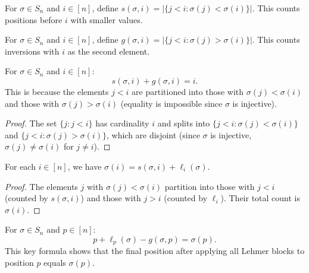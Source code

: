\begin{definition}
\label{def.perm.smallerBefore}
\leanhelper
\leanok
For $\sigma \in S_n$ and $i \in [n]$, define
$s(\sigma, i) = |\{j < i : \sigma(j) < \sigma(i)\}|$.
This counts positions before $i$ with smaller values.
\end{definition}

\begin{definition}
\label{def.perm.largerBefore}
\leanhelper
\leanok
For $\sigma \in S_n$ and $i \in [n]$, define
$g(\sigma, i) = |\{j < i : \sigma(j) > \sigma(i)\}|$.
This counts inversions with $i$ as the second element.
\end{definition}

\begin{lemma}
\label{lem.perm.smallerBefore_add_largerBefore}
\leanhelper
\leanok
For $\sigma \in S_n$ and $i \in [n]$:
\[
s(\sigma, i) + g(\sigma, i) = i.
\]
This is because the elements $j < i$ are partitioned into those with $\sigma(j) < \sigma(i)$
and those with $\sigma(j) > \sigma(i)$ (equality is impossible since $\sigma$ is injective).
\end{lemma}

\begin{proof}
The set $\{j : j < i\}$ has cardinality $i$ and splits into
$\{j < i : \sigma(j) < \sigma(i)\}$ and $\{j < i : \sigma(j) > \sigma(i)\}$,
which are disjoint (since $\sigma$ is injective, $\sigma(j) \neq \sigma(i)$ for $j \neq i$).
\end{proof}

\begin{lemma}
\label{lem.perm.sigma-eq-formula}
\leanhelper
\leanok
For each $i \in [n]$, we have
$\sigma(i) = s(\sigma, i) + \ell_i(\sigma)$.
\end{lemma}

\begin{proof}
\leanok
The elements $j$ with $\sigma(j) < \sigma(i)$ partition into those with $j < i$
(counted by $s(\sigma, i)$) and those with $j > i$
(counted by $\ell_i$). Their total count is $\sigma(i)$.
\end{proof}

\begin{lemma}
\label{lem.perm.final_position_formula}
\leanhelper
\leanok
For $\sigma \in S_n$ and $p \in [n]$:
\[
p + \ell_p(\sigma) - g(\sigma, p) = \sigma(p).
\]
This key formula shows that the final position after applying all Lehmer blocks
to position $p$ equals $\sigma(p)$.
\end{lemma}

